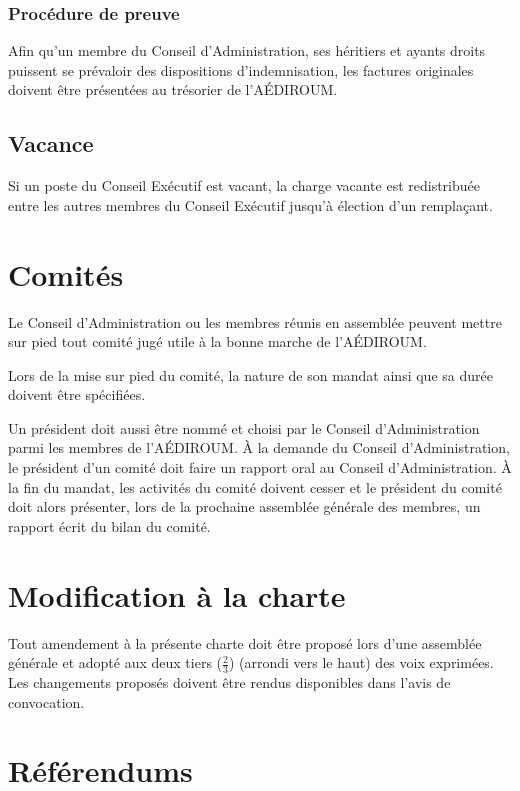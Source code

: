 \documentclass{aediroum}
\begin{document}
\subsubsection{Procédure de preuve}\label{sec:procedure-de-preuve}

Afin qu'un membre du Conseil d'Administration, ses héritiers et ayants droits puissent se prévaloir des dispositions d'indemnisation, les factures originales doivent être présentées au trésorier de l'AÉDIROUM.

\subsection{Vacance}\label{sec:vacance}

Si un poste du Conseil Exécutif est vacant, la charge vacante est redistribuée entre les autres membres du Conseil Exécutif jusqu'à élection d'un remplaçant.

\section{Comités}\label{sec:comites}

Le Conseil d'Administration ou les membres réunis en assemblée peuvent mettre sur pied tout comité jugé utile à la bonne marche de l'AÉDIROUM.

Lors de la mise sur pied du comité, la nature de son mandat ainsi que sa durée doivent être spécifiées.

Un président doit aussi être nommé et choisi par le Conseil d'Administration parmi les membres de l'AÉDIROUM. À la demande du Conseil d'Administration, le président d'un comité doit faire un rapport oral au Conseil d'Administration. À la fin du mandat, les activités du comité doivent cesser et le président du comité doit alors présenter, lors de la prochaine assemblée générale des membres, un rapport écrit du bilan du comité.

\section{Modification à la charte}\label{sec:modification-a-la-charte}

Tout amendement à la présente charte doit être proposé lors d'une assemblée générale et adopté aux deux tiers (\( \frac{2}{3} \)) (arrondi vers le haut) des voix exprimées. Les changements proposés doivent être rendus disponibles dans l'avis de convocation.

\section{Référendums}\label{sec:referendums}
\end{document}
